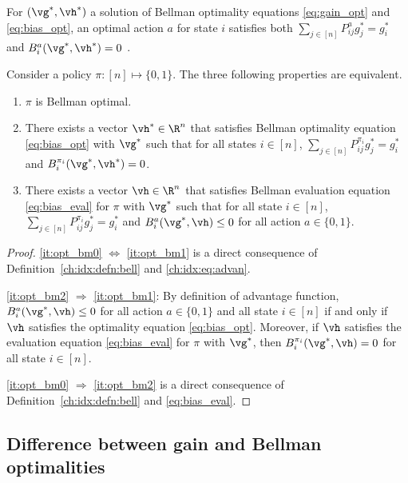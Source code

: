 For $(\vg^*,\vh^*)$ a solution of Bellman optimality equations \eqref{eq:gain_opt} and \eqref{eq:bias_opt},
an optimal action $a$ for state $i$ satisfies both $\sum_{j\in[n]}P^a_{ij}g^*_j =g^*_i$ and $B^a_i(\vg^*,\vh^*)=0$ \cite{puterman2014markov, schweitzer1978functional}.
\begin{lem}
    \label{ch:idx:lem:bell_charac}
    Consider a policy $\pi:[n]\mapsto\{0,1\}$.
    The three following properties are equivalent.
    \begin{enumerate}[label=(\roman*)]
        \item \label{it:opt_bm0} $\pi$ is Bellman optimal.
        \item \label{it:opt_bm1} There exists a vector $\vh^*\in\R^{n}$ that satisfies Bellman optimality equation \eqref{eq:bias_opt} with $\vg^*$ such that for all states $i\in[n]$, $\sum_{j\in[n]}P^{\pi_i}_{ij}g^*_j=g^*_i$ and $B^{\pi_i}_i(\vg^*,\vh^*)=0$.
        \item \label{it:opt_bm2} There exists a vector $\vh\in\R^{n}$ that satisfies Bellman evaluation equation \eqref{eq:bias_eval} for $\pi$ with $\vg^*$ such that for all state $i\in[n]$, $\sum_{j\in[n]}P^{\pi_i}_{ij}g^*_j=g^*_i$ and $B^a_i(\vg^*,\vh)\le0$ for all action $a\in\{0,1\}$.
        \end{enumerate}
\end{lem}
\begin{proof}
    \ref{it:opt_bm0} $\Leftrightarrow$ \ref{it:opt_bm1} is a direct consequence of Definition~\ref{ch:idx:defn:bell} and \eqref{ch:idx:eq:advan}.

    \ref{it:opt_bm2} $\Rightarrow$ \ref{it:opt_bm1}: By definition of advantage function, $B^a_i(\vg^*,\vh)\le0$ for all action $a\in\{0,1\}$ and all state $i\in[n]$ if and only if $\vh$ satisfies the optimality equation \eqref{eq:bias_opt}.
    Moreover, if $\vh$ satisfies the evaluation equation \eqref{eq:bias_eval} for $\pi$ with $\vg^*$, then $B^{\pi_i}_i(\vg^*,\vh)=0$ for all state $i\in[n]$.

    \ref{it:opt_bm0} $\Rightarrow$ \ref{it:opt_bm2} is a direct consequence of Definition~\ref{ch:idx:defn:bell} and \eqref{eq:bias_eval}.
\end{proof}

\subsection{Difference between gain and Bellman optimalities}
\label{ch:idx:ssec:gain_bell}

